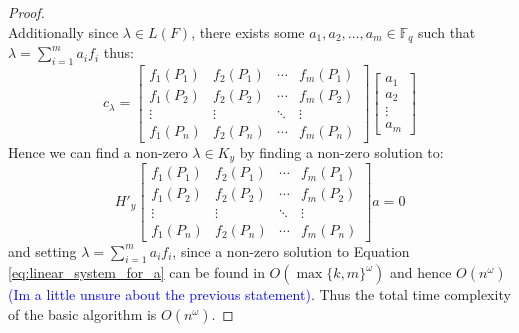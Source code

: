 \begin{proof}
\begin{equation*}
  \end{equation*}
  Additionally since $\lambda \in L(F)$, there exists some $a_1, a_2, \ldots, a_{m} \in \mathbb{F}_q$ such that $\lambda = \sum^m_{i = 1} a_i f_i$ thus:
  \begin{equation*}
    c_\lambda = \begin{bmatrix}
f_1(P_1) & f_2(P_1) & \cdots & f_m(P_{1}) \\
f_1(P_2) & f_2(P_2) & \cdots & f_m(P_{2}) \\
\vdots & \vdots & \ddots & \vdots \\
f_1(P_n) & f_{2}(P_{n}) & \cdots & f_m(P_{n})
    \end{bmatrix} \begin{bmatrix}
a_1 \\ a_2 \\ \vdots \\ a_{m}
                  \end{bmatrix}
  \end{equation*}
  Hence we can find a non-zero $\lambda \in K_y$ by finding a non-zero solution to:
  \begin{equation}\label{eq:linear_system_for_a}
    H'_{y}\begin{bmatrix}
f_1(P_1) & f_2(P_1) & \cdots & f_m(P_{1}) \\
f_1(P_2) & f_2(P_2) & \cdots & f_m(P_{2}) \\
\vdots & \vdots & \ddots & \vdots \\
f_1(P_n) & f_{2}(P_{n}) & \cdots & f_m(P_{n}) \end{bmatrix}
a = 0
  \end{equation}
  and setting $\lambda = \sum_{i=1}^m a_i f_i$, since a non-zero solution to Equation \eqref{eq:linear_system_for_a} can be found in $O(\max \{k, m\}^{\omega})$ and hence $O(n^\omega)$ \textcolor{blue}{(Im a little unsure about the previous statement)}. Thus the total time complexity of the basic algorithm is $O(n^{\omega})$.
\end{proof}
